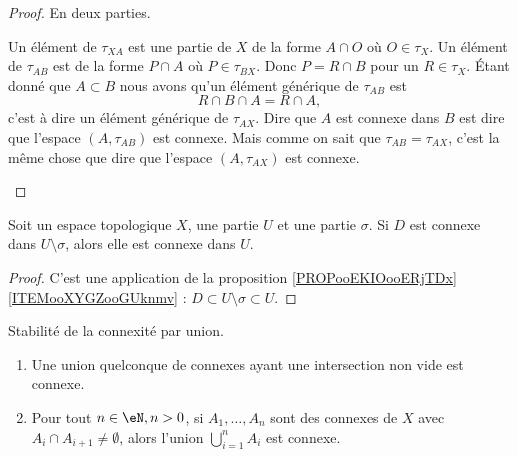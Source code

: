 \begin{proof}
	En deux parties.
	\begin{subproof}
		Un élément de \( \tau_{XA}\) est une partie de \( X\) de la forme \( A\cap O\) où \( O\in \tau_X\).  Un élément de \( \tau_{AB}\) est de la forme \( P\cap A\) où \( P\in \tau_{BX}\). Donc \( P=R\cap B\) pour un \( R\in\tau_X\). Étant donné que \( A\subset B\) nous avons qu'un élément générique de \( \tau_{AB}\) est
		\begin{equation}
			R\cap B\cap A=R\cap A,
		\end{equation}
		c'est à dire un élément générique de \( \tau_{AX}\).
		Dire que \( A\) est connexe dans \( B\) est dire que l'espace \( (A,\tau_{AB})\) est connexe. Mais comme on sait que \( \tau_{AB}=\tau_{AX}\), c'est la même chose que dire que l'espace \( (A,\tau_{AX}) \) est connexe.
	\end{subproof}
\end{proof}

\begin{corollary} \label{CORooBXKPooHXIySw}
	Soit un espace topologique \( X\), une partie \( U\) et une partie \( \sigma\). Si \( D\) est connexe dans \( U\setminus \sigma\), alors elle est connexe dans \( U\).
\end{corollary}

\begin{proof}
	C'est une application de la proposition \ref{PROPooEKIOooERjTDx}\ref{ITEMooXYGZooGUknmv} :  \( D\subset U\setminus\sigma\subset U\).
\end{proof}


\begin{proposition} \label{PropIWIDzzH}
	Stabilité de la connexité par union.
	\begin{enumerate}
		\item       \label{ITEMooLVSSooTGstBz}
		      Une union quelconque de connexes ayant une intersection non vide est connexe.
		\item
		      Pour tout \( n \in \eN, n > 0 \), si \( A_1,\ldots, A_n\) sont des connexes de \( X\) avec \( A_i\cap A_{i+1}\neq \emptyset\), alors l'union \( \bigcup_{i=1}^nA_i\) est connexe.
	\end{enumerate}
\end{proposition}

